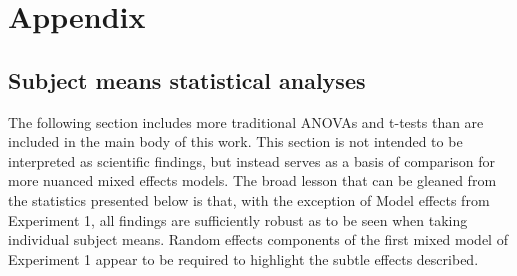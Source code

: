 
\section{Appendix}
    \subsection{Subject means statistical analyses}
            The following section includes more traditional ANOVAs and t-tests than are included in the main body of this work. This section is not intended to be interpreted as scientific findings, but instead serves as a basis of comparison for more nuanced mixed effects models. The broad lesson that can be gleaned from the statistics presented below is that, with the exception of Model effects from Experiment 1, all findings are sufficiently robust as to be seen when taking individual subject means. Random effects components of the first mixed model of Experiment 1 appear to be required to highlight the subtle effects described. \par 
